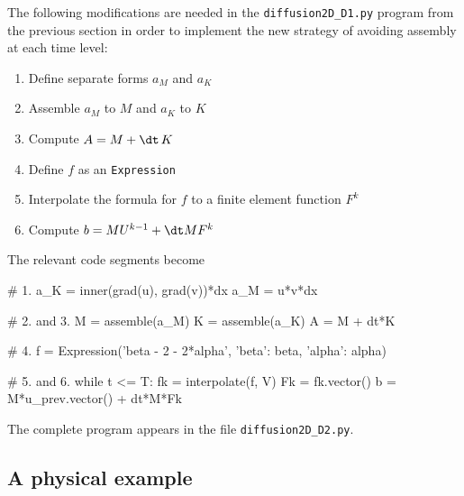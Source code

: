 The following modifications are needed in the {\fontsize{10pt}{10pt}\verb!diffusion2D_D1.py!}
program from the previous section in order to implement the new
strategy of avoiding assembly at each time level:
\begin{enumerate}
\item Define separate forms $a_M$ and $a_K$
\item Assemble $a_M$ to $M$ and $a_K$ to $K$
\item Compute $A=M+{\dt}\, K$
\item Define $f$ as an {\fontsize{10pt}{10pt}\texttt{Expression}}
\item Interpolate the formula for $f$ to a finite element function $F^k$
\item Compute $b=MU^{k-1} + {\dt}MF^k$
\end{enumerate}
The relevant code segments become
\begin{python}
# 1.
a_K = inner(grad(u), grad(v))*dx
a_M = u*v*dx

# 2. and 3.
M = assemble(a_M)
K = assemble(a_K)
A = M + dt*K

# 4.
f = Expression('beta - 2 - 2*alpha', {'beta': beta, 'alpha': alpha})

# 5. and 6.
while t <= T:
    fk = interpolate(f, V)
    Fk = fk.vector()
    b = M*u_prev.vector() + dt*M*Fk
\end{python}
The complete program appears in the file {\fontsize{10pt}{10pt}\verb!diffusion2D_D2.py!}.    


\subsection{A physical example}
\label{langtangen:timedep:diffusion2:sin}

